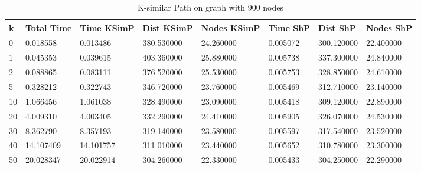 \documentclass[]{article}
\numberwithin{equation}{section}
\begin{document}
\begin{appendices}
\begin{table}[H]
	\centering
	\small
	\setlength\tabcolsep{2pt}
	\begin{tabular}{|l|l|l|l|l|l|l|l|}
		\hline
		k  & Total Time & Time KSimP & Dist KSimP & Nodes KSimP & Time ShP & Dist ShP   & Nodes ShP \\ \hline
		0  & 0.018558   & 0.013486   & 380.530000 & 24.260000   & 0.005072 & 300.120000 & 22.400000 \\ \hline
		1  & 0.045353   & 0.039615   & 403.360000 & 25.880000   & 0.005738 & 337.300000 & 24.840000 \\ \hline
		2  & 0.088865   & 0.083111   & 376.520000 & 25.530000   & 0.005753 & 328.850000 & 24.610000 \\ \hline
		5  & 0.328212   & 0.322743   & 346.720000 & 23.760000   & 0.005469 & 312.710000 & 23.140000 \\ \hline
		10 & 1.066456   & 1.061038   & 328.490000 & 23.090000   & 0.005418 & 309.120000 & 22.890000 \\ \hline
		20 & 4.009310   & 4.003405   & 332.290000 & 24.410000   & 0.005905 & 326.070000 & 24.530000 \\ \hline
		30 & 8.362790   & 8.357193   & 319.140000 & 23.580000   & 0.005597 & 317.540000 & 23.520000 \\ \hline
		40 & 14.107409  & 14.101757  & 311.010000 & 23.440000   & 0.005652 & 310.780000 & 23.300000 \\ \hline
		50 & 20.028347  & 20.022914  & 304.260000 & 22.330000   & 0.005433 & 304.250000 & 22.290000 \\ \hline
	\end{tabular}
	\caption{K-similar Path on graph with 900 nodes}
\end{table}


\end{appendices}
\end{document}
